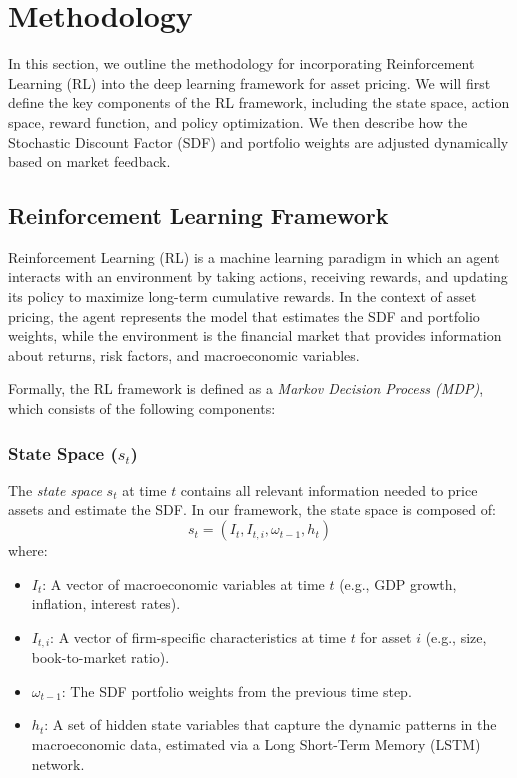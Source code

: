 \section{Methodology}

In this section, we outline the methodology for incorporating Reinforcement Learning (RL) into the deep learning framework for asset pricing. We will first define the key components of the RL framework, including the state space, action space, reward function, and policy optimization. We then describe how the Stochastic Discount Factor (SDF) and portfolio weights are adjusted dynamically based on market feedback.

\subsection{Reinforcement Learning Framework}

Reinforcement Learning (RL) is a machine learning paradigm in which an agent interacts with an environment by taking actions, receiving rewards, and updating its policy to maximize long-term cumulative rewards. In the context of asset pricing, the agent represents the model that estimates the SDF and portfolio weights, while the environment is the financial market that provides information about returns, risk factors, and macroeconomic variables.

Formally, the RL framework is defined as a \textit{Markov Decision Process (MDP)}, which consists of the following components:

\subsubsection{State Space ($s_t$)}

The \textit{state space} $s_t$ at time $t$ contains all relevant information needed to price assets and estimate the SDF. In our framework, the state space is composed of:
\[
s_t = \left(I_t, I_{t, i}, \omega_{t-1}, h_t\right)
\]
where:
\begin{itemize}
    \item $I_t$: A vector of macroeconomic variables at time $t$ (e.g., GDP growth, inflation, interest rates).
    \item $I_{t, i}$: A vector of firm-specific characteristics at time $t$ for asset $i$ (e.g., size, book-to-market ratio).
    \item $\omega_{t-1}$: The SDF portfolio weights from the previous time step.
    \item $h_t$: A set of hidden state variables that capture the dynamic patterns in the macroeconomic data, estimated via a Long Short-Term Memory (LSTM) network.
\end{itemize}

